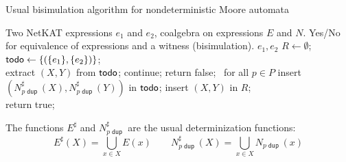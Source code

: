 \documentclass{article}
\newcommand\pdup{\mathop{\mathsf{dup}}}
\begin{document}
\begin{algorithm}
  \caption{Usual bisimulation algorithm for nondeterministic Moore automata
    \label{alg:Moore_naive}}
  \begin{algorithmic}[1]
  \Require Two NetKAT expressions $e_1$ and $e_2$, coalgebra on expressions $E$ and $N$.
  \Ensure Yes/No for equivalence of expressions and a witness (bisimulation).
 {$e_1,e_2$}
\State $R \gets \emptyset$; $\textsf{todo} \gets \{(\{e_1\},\{e_2\})\}$;\\
     \State extract $(X,Y)$ from $\textsf{todo}$;
       continue;
      \Else {} return false; 
      \Else\ for all { $p\in P$} 
       \State  insert $(N_{p\pdup}^\sharp(X) , N_{p\pdup}^\sharp(Y))$ in $\textsf{todo}$;
       \EndIf
       \EndIf
\State insert $(X,Y)$ in $R$; \\
return true;
\EndFunction
\end{algorithmic}
\end{algorithm}

The functions $E^\sharp$ and $N_{p\pdup}^\sharp$ are the usual determinization functions:
$$E^\sharp(X) = \bigcup\limits_{x\in X} E(x)\qquad N_{p\pdup}^\sharp(X) = \bigcup\limits_{x\in X}N_{p\pdup}(x)$$
\end{document}
